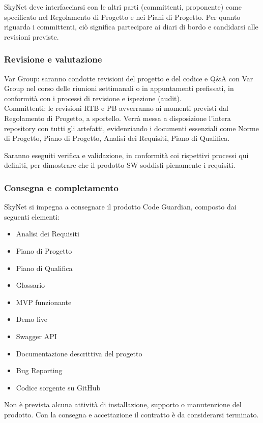 \documentclass[12pt, a4paper]{article}
\begin{document}
SkyNet deve interfacciarsi con le altri parti (committenti, proponente) come specificato nel Regolamento di Progetto e nei Piani di Progetto. Per quanto riguarda i committenti, ciò significa partecipare ai diari di bordo e candidarsi alle revisioni previste.

\subsubsection{Revisione e valutazione}
Var Group: saranno condotte revisioni del progetto e del codice e Q\&A con Var Group nel corso delle riunioni settimanali o in appuntamenti prefissati, in conformità con i processi di revisione e ispezione (audit). \\
Committenti: le revisioni RTB e PB avverranno ai momenti previsti dal Regolamento di Progetto, a sportello. Verrà messa a disposizione l'intera repository con tutti gli artefatti, evidenziando i documenti essenziali come Norme di Progetto, Piano di Progetto, Analisi dei Requisiti, Piano di Qualifica.

Saranno eseguiti verifica e validazione, in conformità coi rispettivi processi qui definiti, per dimostrare che il prodotto SW soddisfi pienamente i requisiti.
\subsubsection{Consegna e completamento}
SkyNet si impegna a consegnare il prodotto Code Guardian, composto dai seguenti elementi:

\begin{itemize}
    \item Analisi dei Requisiti
    \item Piano di Progetto
    \item Piano di Qualifica
    \item Glossario
    \item MVP funzionante
    \item Demo live
    \item Swagger API
    \item Documentazione descrittiva del progetto
    \item Bug Reporting
    \item Codice sorgente su GitHub
\end{itemize}

Non è prevista alcuna attività di installazione, supporto o manutenzione del prodotto. Con la consegna e accettazione il contratto è da considerarsi terminato.
\end{document}
